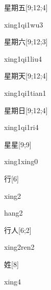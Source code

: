 \begin{verbete}[xing1qi1wu3]{星期五}[9;12;4]
\begin{pronuncia}{xing1qi1wu3}
\end{pronuncia}
\end{verbete}

\begin{verbete}{星期六}[9;12;3]
\begin{pronuncia}{xing1qi1liu4}
\end{pronuncia}
\end{verbete}

\begin{verbete}{星期天}[9;12;4]
\begin{pronuncia}{xing1qi1tian1}
\end{pronuncia}
\end{verbete}

\begin{verbete}[xing1qi1ri4]{星期日}[9;12;4]
\begin{pronuncia}{xing1qi1ri4}
\end{pronuncia}
\end{verbete}

\begin{verbete}{星星}[9;9]
\begin{pronuncia}{xing1xing0}
\end{pronuncia}
\end{verbete}

\begin{verbete}[xing2]{行}[6]
\begin{pronuncia}{xing2}
\end{pronuncia}
\begin{pronuncia}{hang2}
\end{pronuncia}
\end{verbete}

\begin{verbete}{行人}[6;2]
\begin{pronuncia}{xing2ren2}
\end{pronuncia}
\end{verbete}

\begin{verbete}[xing4]{姓}[8]
\begin{pronuncia}{xing4}
\end{pronuncia}
\end{verbete}

